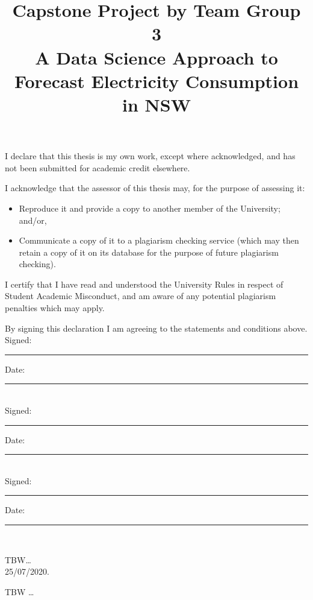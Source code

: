 \documentclass[mstat,12pt]{unswthesis}
\title{Capstone Project by Team Group 3\\[0.5cm]A Data Science Approach
to Forecast Electricity Consumption in NSW}
\author{\Authornameonly}
\begin{document}
\beforepreface




\vskip 2pc \noindent I declare that this thesis is my
own work, except where acknowledged, and has not been submitted for
academic credit elsewhere. 

\vskip 2pc  \noindent I acknowledge that the assessor of this
thesis may, for the purpose of assessing it:
\begin{itemize}
\item Reproduce it and provide a copy to another member of the University; and/or,
\item Communicate a copy of it to a plagiarism checking service (which may then retain a copy of it on its database for the purpose of future plagiarism checking).
\end{itemize}

\vskip 2pc \noindent I certify that I have read and understood the University Rules in
respect of Student Academic Misconduct, and am aware of any potential plagiarism penalties which may 
apply.\vspace{24pt}

\vskip 2pc \noindent By signing 
this declaration I am
agreeing to the statements and conditions above.
\vskip 2pc \noindent
Signed: \rule{7cm}{0.25pt} \hfill Date: \rule{4cm}{0.25pt} \\[1cm]
Signed: \rule{7cm}{0.25pt} \hfill Date: \rule{4cm}{0.25pt} \\[1cm]
Signed: \rule{7cm}{0.25pt} \hfill Date: \rule{4cm}{0.25pt} \\[1cm]
\vskip 1pc





{\bigskip}TBW\ldots{}\\[1cm] 

{\bigskip\bigskip\bigskip\noindent} 25/07/2020.




TBW \ldots{}



\afterpreface
\end{document}
